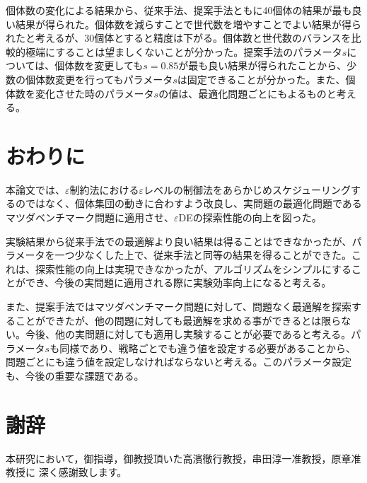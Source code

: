 \documentclass[a4paper,12pt]{jsreport}
\begin{document}
個体数の変化による結果から、従来手法、提案手法ともに40個体の結果が最も良い結果が得られた。個体数を減らすことで世代数を増やすことでよい結果が得られたと考えるが、30個体とすると精度は下がる。個体数と世代数のバランスを比較的極端にすることは望ましくないことが分かった。提案手法のパラメータ$s$については、個体数を変更しても$s=0.85$が最も良い結果が得られたことから、少数の個体数変更を行ってもパラメータ$s$は固定できることが分かった。また、個体数を変化させた時のパラメータ$s$の値は、最適化問題ごとにもよるものと考える。






\chapter{おわりに}
本論文では、$\varepsilon$制約法における$\varepsilon$レベルの制御法をあらかじめスケジューリングするのではなく、個体集団の動きに合わすよう改良し、実問題の最適化問題であるマツダベンチマーク問題に適用させ、$\varepsilon$DEの探索性能の向上を図った。

実験結果から従来手法での最適解より良い結果は得ることはできなかったが、パラメータを一つ少なくした上で、従来手法と同等の結果を得ることができた。これは、探索性能の向上は実現できなかったが、アルゴリズムをシンプルにすることができ、今後の実問題に適用される際に実験効率向上になると考える。

また、提案手法ではマツダベンチマーク問題に対して、問題なく最適解を探索することができたが、他の問題に対しても最適解を求める事ができるとは限らない。今後、他の実問題に対しても適用し実験することが必要であると考える。パラメータ$s$も同様であり、戦略ごとでも違う値を設定する必要があることから、問題ごとにも違う値を設定しなければならないと考える。このパラメータ設定も、今後の重要な課題である。


\chapter*{謝辞}

本研究において，御指導，御教授頂いた高濱徹行教授，串田淳一准教授，原章准教授に
深く感謝致します。





\end{document}
